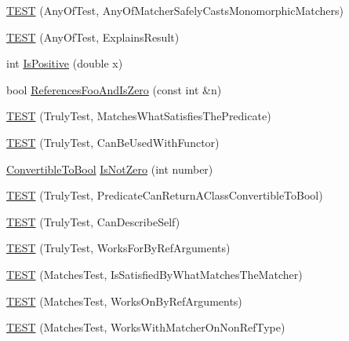 \begin{DoxyCompactItemize}
\item 
\hyperlink{namespacetesting_1_1gmock__matchers__test_a8fb1598253450afeb0440682cd23999e}{T\+E\+ST} (Any\+Of\+Test, Any\+Of\+Matcher\+Safely\+Casts\+Monomorphic\+Matchers)
\item 
\hyperlink{namespacetesting_1_1gmock__matchers__test_ad4c09014fce6029575e2c337cde85bdf}{T\+E\+ST} (Any\+Of\+Test, Explains\+Result)
\item 
int \hyperlink{namespacetesting_1_1gmock__matchers__test_a70e728cf67d0224c3ebb9eb8959cc39d}{Is\+Positive} (double x)
\item 
bool \hyperlink{namespacetesting_1_1gmock__matchers__test_abdce9daf2e3d3721d68f76680129f03b}{References\+Foo\+And\+Is\+Zero} (const int \&n)
\item 
\hyperlink{namespacetesting_1_1gmock__matchers__test_ab7761562a8ffea67a485f3f649f6430a}{T\+E\+ST} (Truly\+Test, Matches\+What\+Satisfies\+The\+Predicate)
\item 
\hyperlink{namespacetesting_1_1gmock__matchers__test_ab3e259f3ae45e199474d7c6d554852f0}{T\+E\+ST} (Truly\+Test, Can\+Be\+Used\+With\+Functor)
\item 
\hyperlink{classtesting_1_1gmock__matchers__test_1_1ConvertibleToBool}{Convertible\+To\+Bool} \hyperlink{namespacetesting_1_1gmock__matchers__test_a248045bc57c8bad87b7d185b5c292f60}{Is\+Not\+Zero} (int number)
\item 
\hyperlink{namespacetesting_1_1gmock__matchers__test_a24529fd7834d272009af74106422fe54}{T\+E\+ST} (Truly\+Test, Predicate\+Can\+Return\+A\+Class\+Convertible\+To\+Bool)
\item 
\hyperlink{namespacetesting_1_1gmock__matchers__test_af474a9719e614d521c71bdf7c39f6a7a}{T\+E\+ST} (Truly\+Test, Can\+Describe\+Self)
\item 
\hyperlink{namespacetesting_1_1gmock__matchers__test_ae702d436c52bd37fe3e8d405d7e6a691}{T\+E\+ST} (Truly\+Test, Works\+For\+By\+Ref\+Arguments)
\item 
\hyperlink{namespacetesting_1_1gmock__matchers__test_a6617484cbb644af9882fc5d853112aae}{T\+E\+ST} (Matches\+Test, Is\+Satisfied\+By\+What\+Matches\+The\+Matcher)
\item 
\hyperlink{namespacetesting_1_1gmock__matchers__test_a6cfa391c9035262ccdc0d8f59e037b4d}{T\+E\+ST} (Matches\+Test, Works\+On\+By\+Ref\+Arguments)
\item 
\hyperlink{namespacetesting_1_1gmock__matchers__test_a9fd734ae5afb64a7285503bc0870c255}{T\+E\+ST} (Matches\+Test, Works\+With\+Matcher\+On\+Non\+Ref\+Type)
\item 

\end{DoxyCompactItemize}
